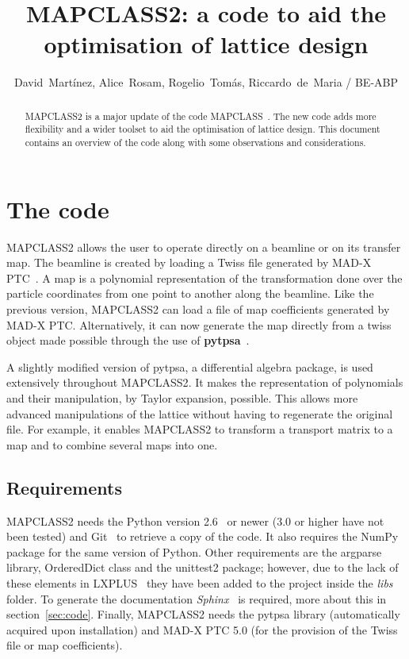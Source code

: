 \documentclass[a4paper]{cernatsnote}
\title{MAPCLASS2: a code to aid the optimisation of lattice design}
\author{David~Mart\'inez, Alice~Rosam, Rogelio~Tom\'as,
  Riccardo~de~Maria / BE-ABP}
\begin{document}
\maketitle %

\begin{abstract}
\textsc{MAPCLASS2} is a major update of the code
\textsc{MAPCLASS}~\cite{mapclass}. The new code adds more flexibility
and a wider toolset to aid the optimisation of lattice design. This
document contains an overview of the code along with some observations
and considerations.
\end{abstract}

\section{The code}
\label{sec:intro}
\textsc{MAPCLASS2} allows the user to operate directly on a beamline
or on its transfer map. The beamline is created by loading a Twiss
file generated by \textsc{MAD-X PTC}~\cite{madx}. A map is a polynomial
representation of the transformation done over the particle
coordinates from one point to another along the beamline. Like the
previous version, MAPCLASS2 can load a file of map coefficients
generated by \textsc{MAD-X PTC}. Alternatively, it can now generate the
map directly from a twiss object made possible through the use of
\textbf{pytpsa}~\cite{pytpsa}.

A slightly modified version of pytpsa, a differential algebra package,
is used extensively throughout \textsc{MAPCLASS2}. It makes the
representation of polynomials and their manipulation, by Taylor
expansion, possible. This allows more advanced manipulations of the lattice
without having to regenerate the original file. For example, it enables
\textsc{MAPCLASS2} to transform a transport matrix to a map and to combine
several maps into one.

\subsection{Requirements}
\label{sec:req}
\textsc{MAPCLASS2} needs the Python version 2.6~\cite{python} or newer
(3.0 or higher have not been tested) and Git~\cite{git} to retrieve a
copy of the code. It also requires the NumPy~\cite{numpy} package for
the same version of Python. Other requirements are the argparse
library, OrderedDict class and the unittest2 package; however, due to
the lack of these elements in LXPLUS~\cite{lxplus} they have been
added to the project inside the \textit{libs} folder. To generate the
documentation \textit{Sphinx}~\cite{sphinx} is required, more about
this in section~\ref{sec:code}. Finally, \textsc{MAPCLASS2} needs the
pytpsa library (automatically acquired upon installation) and
\textsc{MAD-X PTC 5.0} (for the provision of the Twiss file or map
coefficients).
\end{document}
